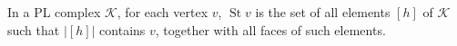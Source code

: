 In a PL complex $\mathcal{K}$, for each vertex $v$, $\operatorname{St} v$ is the set of all elements $[h]$ of $\mathcal{K}$ such that $|[h]|$ contains $v$, together with all faces of such elements.
